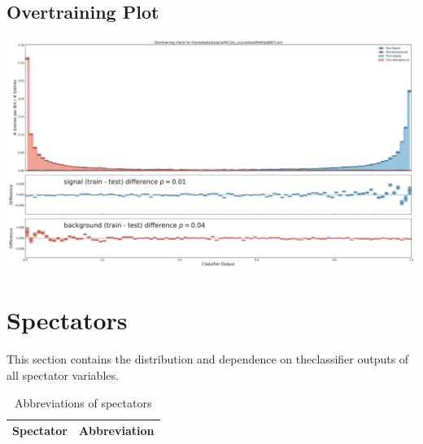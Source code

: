 \documentclass[10pt,a4paper]{article}
\begin{document}
\subsection{Overtraining Plot}
\begin{center}
\includegraphics[width=1.0\textwidth]{overtraining_plot_-6962044671939454446.pdf}
\end{center}
\raggedbottom
\pagebreak[0]
\FloatBarrier
\section{Spectators}
This section contains the distribution and dependence on theclassifier outputs of all spectator variables.\begin{center}
\begin{longtable}{ll}
\caption{Abbreviations of spectators}\\
\toprule
Spectator & Abbreviation\\
\midrule
\bottomrule
\end{longtable}
\end{center}
\end{document}
